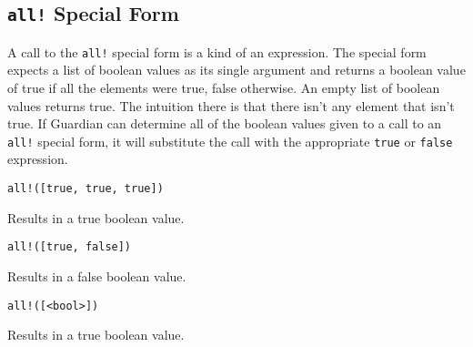
\subsection{\texttt{all!} Special Form}
{
	A call to the \texttt{all!} special form is a kind of an expression.
	The special form expects a list of boolean values as its
	single argument and returns a boolean value of true if all the elements
	were true, false otherwise. An empty list of boolean values returns true.
	The intuition there is that there isn't any element that isn't true.
	If Guardian can determine all of the boolean values given to a call to an
	\texttt{all!} special form, it will substitute the call with the
	appropriate \texttt{true} or \texttt{false} expression.
	
	\begin{itemize}
	{
		\item \texttt{all!([true, true, true])}
		
			Results in a true boolean value.
		
		\item \texttt{all!([true, false])}
		
			Results in a false boolean value.
		
		\item \texttt{all!([<bool>])}
		
			Results in a true boolean value.
	}
	\end{itemize}
}
